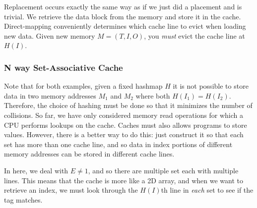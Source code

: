     \begin{theorem}[Replacement]
      Replacement occurs exactly the same way as if we just did a placement and is trivial. We retrieve the data block from the memory and store it in the cache. Direct-mapping conveniently determines which cache line to evict when loading new data. Given new memory $M = (T, I, O)$, you \textit{must} evict the cache line at $H(I)$. 
    \end{theorem}

  \subsubsection{N way Set-Associative Cache}

    Note that for both examples, given a fixed hashmap $H$ it is not possible to store data in two memory addresses $M_1$ and $M_2$ where both $H(I_1) = H(I_2)$. Therefore, the choice of hashing must be done so that it minimizes the number of collisions. So far, we have only considered memory read operations for which a CPU performs lookups on the cache. Caches must also allows programs to store values. However, there is a better way to do this: just construct it so that each set has more than one cache line, and so data in index portions of different memory addresses can be stored in different cache lines.

    In here, we deal with $E \neq 1$, and so there are multiple set each with multiple lines. This means that the cache is more like a 2D array, and when we want to retrieve an index, we must look through the $H(I)$th line in \textit{each} set to see if the tag matches. 

